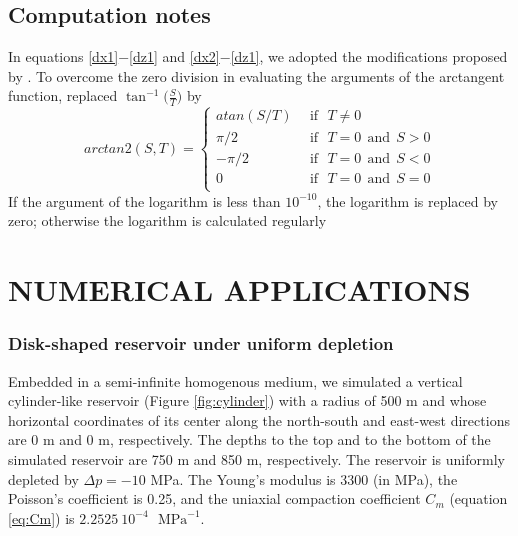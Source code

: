 \documentclass[journal abbreviation, manuscript]{copernicus}
\begin{document}
\subsection{Computation notes}

In equations \ref{dx1}$-$\ref{dz1} and \ref{dx2}$-$\ref{dz1}, we adopted the modifications proposed by \cite{Fukushima2020}.
To overcome the zero division in evaluating the arguments of the arctangent function, \cite{Fukushima2020} replaced  $\tan^{-1} \big( \frac{S}{T} \big)$ by 
\begin{equation}
arctan2(S,T) = 
  \left\{ \begin{aligned}
      atan (S/T) & \:\: \mbox{if} \: \:\:  T \neq 0 \\
      \pi /2 & \:\: \mbox{if} \: \:\:  T = 0  \: \: \mbox{and} \: \:S > 0 \\
      -\pi /2 & \:\: \mbox{if} \: \:\:  T = 0  \: \: \mbox{and} \: \:S < 0 \\
         0 & \:\: \mbox{if} \: \:\:  T = 0  \: \: \mbox{and} \: \:S = 0 \\
  \end{aligned} \right.
\label{eq:arctan2}  
\end{equation}
If the argument of the logarithm is less than $10^{-10}$, the logarithm is replaced by zero; otherwise the logarithm is  calculated regularly



\section{NUMERICAL APPLICATIONS}

\subsubsection{Disk-shaped reservoir under uniform depletion}

Embedded in a semi-infinite homogenous medium, we simulated a vertical cylinder-like reservoir (Figure \ref{fig:cylinder}) with a radius of 500 m and whose horizontal coordinates of its center along the north-south and east-west directions are 0 m and 0 m, respectively.
The depths to the top and to the bottom of the simulated reservoir are 750 m and 850 m, respectively.
The reservoir is uniformly depleted by $\Delta p = -10$ MPa. 
The Young’s modulus is  3300 (in MPa), the Poisson's coefficient is 0.25, and
the uniaxial compaction coefficient $C_{m}$  (equation \ref{eq:Cm}) is $2.2525 \: 10^{-4}$
$\textrm{ MPa}^{-1}$.
\end{document}

